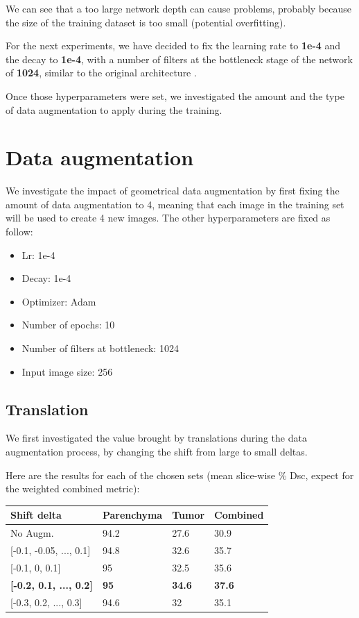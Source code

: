 We can see that a too large network depth can cause problems, probably
because the size of the training dataset is too small (potential overfitting).

For the next experiments, we have decided to fix the learning rate to
\textbf{1e-4} and the decay to \textbf{1e-4}, with a number of filters
at the bottleneck stage of the network of \textbf{1024}, similar to the
original architecture \cite{Ronneberger2015}.

Once those hyperparameters were set, we investigated the amount and the
type of data augmentation to apply during the training.

\section{Data augmentation}\label{data-augmentation}

We investigate the impact of geometrical data augmentation by first
fixing the amount of data augmentation to 4, meaning that each image in
the training set will be used to create 4 new images. The other
hyperparameters are fixed as follow:

\begin{itemize}
\item
  Lr: 1e-4
\item
  Decay: 1e-4
\item
  Optimizer: Adam
\item
  Number of epochs: 10
\item
  Number of filters at bottleneck: 1024
\item
  Input image size: 256
\end{itemize}

\subsection*{Translation }\label{translation}

We first investigated the value brought by translations during the data
augmentation process, by changing the shift from large to small deltas.

Here are the results for each of the chosen sets (mean slice-wise \% Dsc, expect for the weighted combined metric):

\begin{longtable}[c]{@{}llll@{}}
\toprule
\textbf{Shift delta} & \textbf{Parenchyma} & \textbf{Tumor} &
\textbf{Combined}\tabularnewline
\midrule
\endhead
No Augm. & 94.2 & 27.6 & 30.9\tabularnewline
{[}-0.1, -0.05, ..., 0.1{]} & 94.8 & 32.6 & 35.7\tabularnewline
{[}-0.1, 0, 0.1{]} & 95 & 32.5 & 35.6\tabularnewline
\textbf{{[}-0.2, 0.1, ..., 0.2{]}} & \textbf{95} & \textbf{34.6} &
\textbf{37.6}\tabularnewline
{[}-0.3, 0.2, ..., 0.3{]} & 94.6 & 32 & 35.1\tabularnewline
\bottomrule
\end{longtable}

